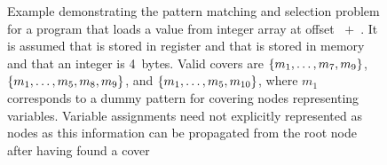 \begin{figure}
  \centering%
                {}%
  \hfill%
  \hfill%

  \caption[Example of the pattern matching and selection problem]%
          {%
            Example demonstrating the pattern matching and selection problem for
            a program that loads a value from integer array  at offset
            \mbox{ $+$ }.
            It is assumed that  is
            stored in register and that  is stored in memory and that
            an integer is 4~bytes.
            Valid covers are \mbox{$\mSet{m_1, \ldots, m_7, m_9}$},
            \mbox{$\mSet{m_1, \ldots, m_5, m_8, m_9}$}, and
            \mbox{$\mSet{m_1, \ldots, m_5, m_{10}}$}, where $m_1$ corresponds to
            a dummy pattern for covering nodes representing variables.
            Variable assignments need not explicitly represented as nodes as
            this information can be propagated from the root node after having
            found a cover%
          }
\end{figure}

